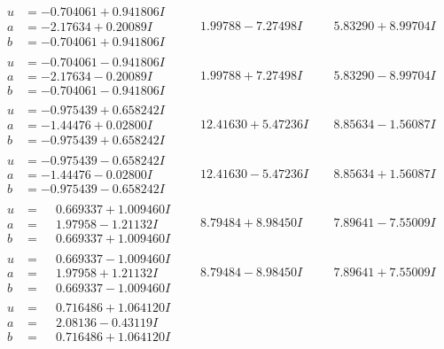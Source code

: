 \documentclass[1p]{elsarticle_modified}
\theoremstyle{definition}
\begin{document}
$$\begin{array}{c|c|c}
\begin{aligned}
u &= -0.704061 + 0.941806 I \\
a &= -2.17634 + 0.20089 I \\
b &= -0.704061 + 0.941806 I\end{aligned}
 & \phantom{-}1.99788 - 7.27498 I & \phantom{-}5.83290 + 8.99704 I \\ \hline\begin{aligned}
u &= -0.704061 - 0.941806 I \\
a &= -2.17634 - 0.20089 I \\
b &= -0.704061 - 0.941806 I\end{aligned}
 & \phantom{-}1.99788 + 7.27498 I & \phantom{-}5.83290 - 8.99704 I \\ \hline\begin{aligned}
u &= -0.975439 + 0.658242 I \\
a &= -1.44476 + 0.02800 I \\
b &= -0.975439 + 0.658242 I\end{aligned}
 & \phantom{-}12.41630 + 5.47236 I & \phantom{-}8.85634 - 1.56087 I \\ \hline\begin{aligned}
u &= -0.975439 - 0.658242 I \\
a &= -1.44476 - 0.02800 I \\
b &= -0.975439 - 0.658242 I\end{aligned}
 & \phantom{-}12.41630 - 5.47236 I & \phantom{-}8.85634 + 1.56087 I \\ \hline\begin{aligned}
u &= \phantom{-}0.669337 + 1.009460 I \\
a &= \phantom{-}1.97958 - 1.21132 I \\
b &= \phantom{-}0.669337 + 1.009460 I\end{aligned}
 & \phantom{-}8.79484 + 8.98450 I & \phantom{-}7.89641 - 7.55009 I \\ \hline\begin{aligned}
u &= \phantom{-}0.669337 - 1.009460 I \\
a &= \phantom{-}1.97958 + 1.21132 I \\
b &= \phantom{-}0.669337 - 1.009460 I\end{aligned}
 & \phantom{-}8.79484 - 8.98450 I & \phantom{-}7.89641 + 7.55009 I \\ \hline\begin{aligned}
u &= \phantom{-}0.716486 + 1.064120 I \\
a &= \phantom{-}2.08136 - 0.43119 I \\
b &= \phantom{-}0.716486 + 1.064120 I\end{aligned}

\end{array}$$
\end{document}
